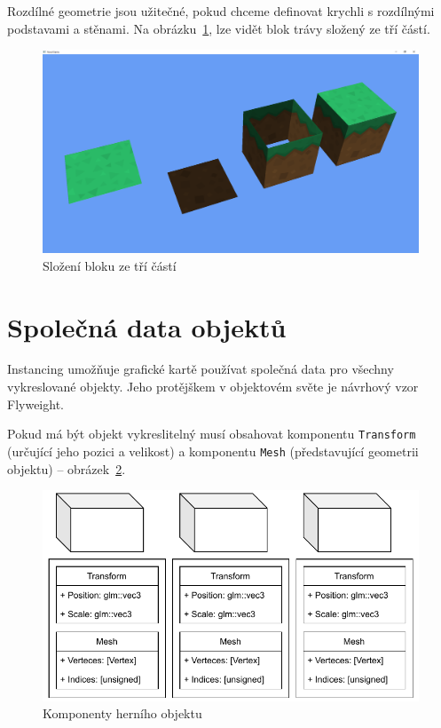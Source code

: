 \documentclass[thesis=M,czech]{FITthesis}[2019/12/23]
\begin{document}
Rozdílné geometrie jsou užitečné, pokud chceme definovat krychli s rozdílnými podstavami a stěnami. Na obrázku~\ref{fig:block_composition}, lze vidět blok trávy složený ze tří částí.

\begin{figure}\centering
	\includegraphics[width=\textwidth]{images/block_composition}
	\caption[Složení bloku ze tří částí]{Složení bloku ze tří částí}\label{fig:block_composition}
\end{figure}

\section{Společná data objektů}

Instancing umožňuje grafické kartě používat společná data pro všechny vykreslované objekty. Jeho protějškem v objektovém světe je návrhový vzor Flyweight.

Pokud má být objekt vykreslitelný musí obsahovat komponentu \texttt{Transform} (určující jeho pozici a velikost) a komponentu \texttt{Mesh} (představující geometrii objektu) -- obrázek~\ref{fig:go_components}.

\begin{figure}\centering
	\includegraphics[width=\textwidth]{images/go_components}
	\caption[Komponenty herního objektu]{Komponenty herního objektu}\label{fig:go_components}
\end{figure}
\end{document}
